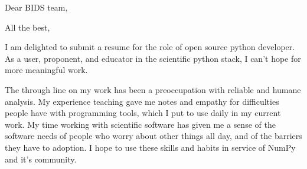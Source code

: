 \documentclass[11pt,a4paper,sans]{moderncv}        %
\begin{document}
\recipient{~}{~}
\date{\today}
\opening{Dear BIDS team,}
\closing{All the best,}
\makelettertitle

I am delighted to submit a resume for the role of open source python developer.
As a user, proponent, and educator in the scientific python stack, I can't hope for more meaningful work.

The through line on my work has been a preoccupation with reliable and humane analysis. 
My experience teaching gave me notes and empathy for difficulties people have with programming tools, which I put to use daily in my current work. 
My time working with scientific software has given me a sense of the software needs of people who worry about other things all day, and of the barriers they have to adoption. 
I hope to use these skills and habits in service of NumPy and it's community.

\makeletterclosing
\end{document}
